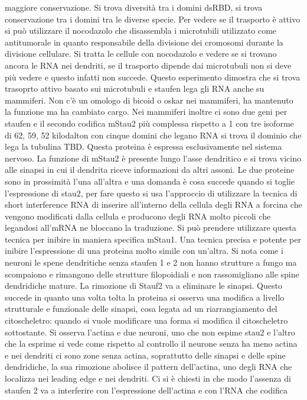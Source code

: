maggiore conservazione. Si trova diversit\`a tra i domini dsRBD, si trova conservazione tra i domini tra le diverse specie. Per vedere se il trasporto \`e attivo si pu\`o utilizzare il
nocodazolo che disassembla i microtubili utilizzato come antitumorale in quanto responsabile della divisione dei cromosomi durante la divisione cellulare. Si tratta le cellule con 
nocodazolo e vedere se si trovano ancora le RNA nei dendriti, se il trasporto dipende dai microtubuli non si deve pi\`u vedere e questo infatti non succede. Questo esperimento dimostra
che si trova trasoprto attivo basato sui microtubuli e staufen lega gli RNA anche su mammiferi. Non c'\`e un omologo di bicoid o oskar nei mammiferi, ha mantenuto la funzione ma ha
cambiato cargo. Nei mammiferi inoltre ci sono due geni per staufen e il secondo codifica mStau2 pi\`u complessa rispetto a 1 con tre isoforme di 62, 59, 52 kilodalton con cinque 
domini che legano RNA si trova il dominio che lega la tubulina TBD. Questa proteina \`e espressa esclusivamente nel sistema nervoso. La funzione di mStau2 \`e presente lungo l'asse 
dendritico e si trova vicino alle sinapsi in cui il dendrita riceve informazioni da altri assoni. Le due proteine sono in prossimit\`a l'una all'altra e una domanda \`e cosa succede
quando si toglie l'espressione di stau2, per fare questo si usa l'approccio di utilizzare la tecnica di short interference RNA di inserire all'interno della cellula degli RNA a forcina
che vengono modificati dalla cellula e producono degli RNA molto piccoli che legandosi all'mRNA ne bloccano la traduzione. Si pu\`o prendere utilizzare questa tecnica per inibire in 
maniera specifica mStau1. Una tecnica precisa e potente per inibire l'espressione di una proteina molto simile con un'altra. Si nota come i neuroni le spene dendritiche senza staufen 1 e 
2 non hanno strutture a fungo ma scompaiono e rimangono delle strutture filopoidiali e non rassomigliano alle spine dendridiche mature. La rimozione di Stauf2 va a eliminare le sinapsi. 
Questo succede in quanto una volta tolta la proteina si osserva una modifica a livello strutturale e funzionale delle sinapsi, cosa legata ad un riarrangiamento del citoscheletro: quando
si vuole modificare una forma si modifica il citoscheletro sottostante. Si osserva l'actina e due neuroni, uno che non espime stau2 e l'altro che la esprime si vede come rispetto al
controllo il neurone senza ha meno actina e nei dendriti ci sono zone senza actina, soprattutto delle sinapsi e delle spine dendridiche, la sua rimozione abolisce il pattern dell'actina,
uno degli RNA che localizza nei leading edge e nei dendriti. Ci si \`e chiesti in che modo l'assenza di staufen 2 va a interferire con l'espressione dell'actina e con l'RNA che codifica
